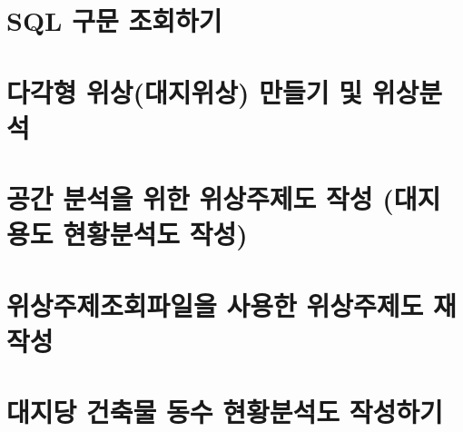 \documentclass[12pt,a4paper,oneside]{book}
\begin{document}
\chapter{SQL 구문 조회하기}


\newpage
\chapter{다각형 위상(대지위상) 만들기 및 위상분석}


\newpage
\chapter{공간 분석을 위한 위상주제도 작성 (대지용도 현황분석도 작성)}


\newpage
\chapter{위상주제조회파일을 사용한 위상주제도 재작성}

\newpage
\chapter{대지당 건축물 동수 현황분석도 작성하기}



























\end{document}
